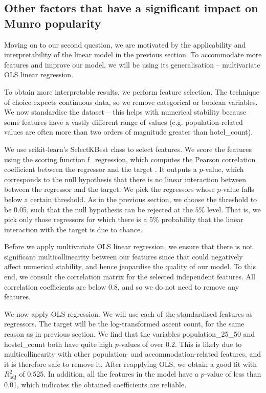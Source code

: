 \documentclass[11pt,a4paper]{article}
\begin{document}
\subsection{Other factors that have a significant impact on Munro popularity}
Moving on to our second question, we are motivated by the applicability and interpretability of the linear model in the previous section. To accommodate more features and improve our model, we will be using its generalisation – multivariate OLS linear regression.

To obtain more interpretable results, we perform feature selection. The technique of choice expects continuous data, so we remove categorical or boolean variables. We now standardise the dataset – this helps with numerical stability because some features have a vastly different range of values (e.g. population-related values are often more than two orders of magnitude greater than hotel\_count).

We use scikit-learn's SelectKBest class to select features. We score the features using the scoring function f\_regression, which computes the Pearson correlation coefficient between the regressor and the target \cite{scikit-learn}. It outputs a $p$-value, which corresponds to the null hypothesis that there is no linear interaction between between the regressor and the target. We pick the regressors whose $p$-value falls below a certain threshold. As in the previous section, we choose the threshold to be 0.05, such that the null hypothesis can be rejected at the $5\%$ level. That is, we pick only those regressors for which there is a $5\%$ probability that the linear interaction with the target is due to chance.

Before we apply multivariate OLS linear regression, we ensure that there is not significant multicollinearity between our features since that could negatively affect numerical stability, and hence jeopardise the quality of our model. To this end, we consult the correlation matrix for the selected independent features. All correlation coefficients are below 0.8, and so we do not need to remove any features.

We now apply OLS regression. We will use each of the standardised features as regressors. The target will be the log-transformed ascent count, for the same reason as in previous section. We find that the variables population\_25\_50 and hostel\_count both have quite high $p$-values of over 0.2. This is likely due to multicollinearity with other population- and accommodation-related features, and it is therefore safe to remove it. After reapplying OLS, we obtain a good fit with $R_\text{adj}^{2}$ of 0.525. In addition, all the features in the model have a $p$-value of less than 0.01, which indicates the obtained coefficients are reliable.
\end{document}
